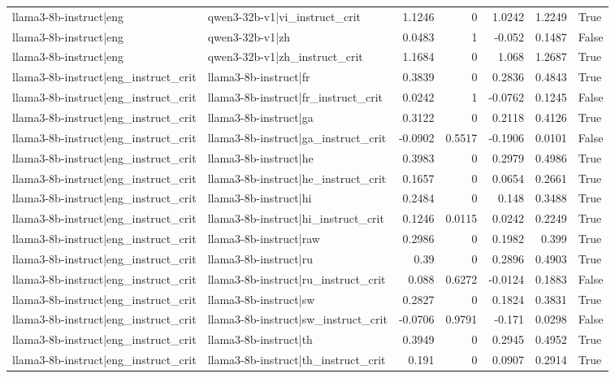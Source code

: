 \begin{table}
\begin{tabular}{l l r r r r l}
llama3-8b-instruct|eng & qwen3-32b-v1|vi_instruct_crit & 1.1246 & 0 & 1.0242 & 1.2249 & True \\
llama3-8b-instruct|eng & qwen3-32b-v1|zh & 0.0483 & 1 & -0.052 & 0.1487 & False \\
llama3-8b-instruct|eng & qwen3-32b-v1|zh_instruct_crit & 1.1684 & 0 & 1.068 & 1.2687 & True \\
llama3-8b-instruct|eng_instruct_crit & llama3-8b-instruct|fr & 0.3839 & 0 & 0.2836 & 0.4843 & True \\
llama3-8b-instruct|eng_instruct_crit & llama3-8b-instruct|fr_instruct_crit & 0.0242 & 1 & -0.0762 & 0.1245 & False \\
llama3-8b-instruct|eng_instruct_crit & llama3-8b-instruct|ga & 0.3122 & 0 & 0.2118 & 0.4126 & True \\
llama3-8b-instruct|eng_instruct_crit & llama3-8b-instruct|ga_instruct_crit & -0.0902 & 0.5517 & -0.1906 & 0.0101 & False \\
llama3-8b-instruct|eng_instruct_crit & llama3-8b-instruct|he & 0.3983 & 0 & 0.2979 & 0.4986 & True \\
llama3-8b-instruct|eng_instruct_crit & llama3-8b-instruct|he_instruct_crit & 0.1657 & 0 & 0.0654 & 0.2661 & True \\
llama3-8b-instruct|eng_instruct_crit & llama3-8b-instruct|hi & 0.2484 & 0 & 0.148 & 0.3488 & True \\
llama3-8b-instruct|eng_instruct_crit & llama3-8b-instruct|hi_instruct_crit & 0.1246 & 0.0115 & 0.0242 & 0.2249 & True \\
llama3-8b-instruct|eng_instruct_crit & llama3-8b-instruct|raw & 0.2986 & 0 & 0.1982 & 0.399 & True \\
llama3-8b-instruct|eng_instruct_crit & llama3-8b-instruct|ru & 0.39 & 0 & 0.2896 & 0.4903 & True \\
llama3-8b-instruct|eng_instruct_crit & llama3-8b-instruct|ru_instruct_crit & 0.088 & 0.6272 & -0.0124 & 0.1883 & False \\
llama3-8b-instruct|eng_instruct_crit & llama3-8b-instruct|sw & 0.2827 & 0 & 0.1824 & 0.3831 & True \\
llama3-8b-instruct|eng_instruct_crit & llama3-8b-instruct|sw_instruct_crit & -0.0706 & 0.9791 & -0.171 & 0.0298 & False \\
llama3-8b-instruct|eng_instruct_crit & llama3-8b-instruct|th & 0.3949 & 0 & 0.2945 & 0.4952 & True \\
llama3-8b-instruct|eng_instruct_crit & llama3-8b-instruct|th_instruct_crit & 0.191 & 0 & 0.0907 & 0.2914 & True \\

\end{tabular}
\end{table}
